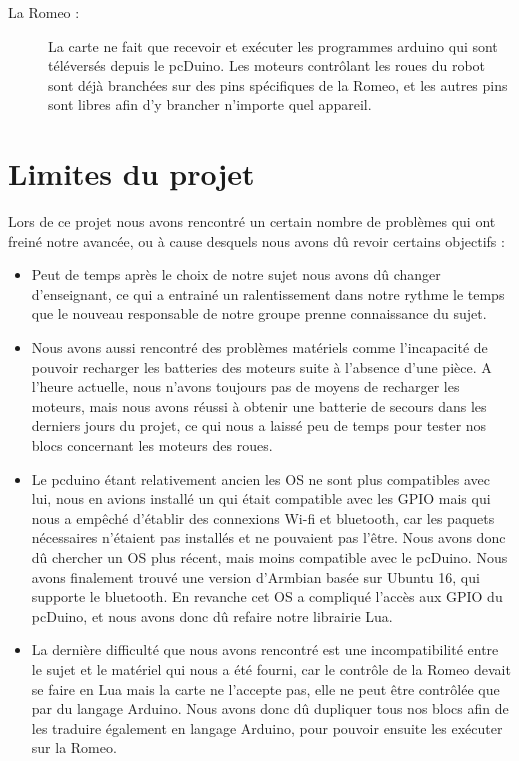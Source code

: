 \documentclass[12pt,francais]{report}
\begin{document}
\begin{description}
\item [La Romeo :] La carte ne fait que recevoir et exécuter les programmes arduino qui sont téléversés depuis le pcDuino. Les moteurs contrôlant les roues du robot sont déjà branchées sur des pins spécifiques de la Romeo, et les autres pins sont libres afin d'y brancher n'importe quel appareil.

\end{description}

\section*{Limites du projet}



Lors de ce projet nous avons rencontré un certain nombre de problèmes qui ont freiné notre avancée, ou à cause desquels nous avons dû revoir certains objectifs :
\begin{itemize}
	\item Peut de temps après le choix de notre sujet nous avons dû changer d'enseignant, ce qui a entrainé un ralentissement dans notre rythme le temps que le nouveau responsable de notre groupe prenne connaissance du sujet.
	\item Nous avons aussi rencontré des problèmes matériels comme l'incapacité de pouvoir recharger les batteries des moteurs suite à l'absence d'une pièce. A l'heure actuelle, nous n'avons toujours pas de moyens de recharger les moteurs, mais nous avons réussi à obtenir une batterie de secours dans les derniers jours du projet, ce qui nous a laissé peu de temps pour tester nos blocs concernant les moteurs des roues. 
	\item Le pcduino étant relativement ancien les OS ne sont plus compatibles avec lui, nous en avions installé un qui était compatible avec les GPIO mais qui nous a empêché d'établir des connexions Wi-fi et bluetooth, car les paquets nécessaires n'étaient pas installés et ne pouvaient pas l'être. Nous avons donc dû chercher un OS plus récent, mais moins compatible avec le pcDuino. Nous avons finalement trouvé une version d'Armbian basée sur Ubuntu 16, qui supporte le bluetooth. En revanche cet OS a compliqué l'accès aux GPIO du pcDuino, et nous avons donc dû refaire notre librairie Lua.
	\item La dernière difficulté que nous avons rencontré est une incompatibilité entre le sujet et le matériel qui nous a été fourni, car le contrôle de la Romeo devait se faire en Lua mais la carte ne l'accepte pas, elle ne peut être contrôlée que par du langage Arduino. Nous avons donc dû dupliquer tous nos blocs afin de les traduire également en langage Arduino, pour pouvoir ensuite les exécuter sur la Romeo.	
\end{itemize}
\end{document}
